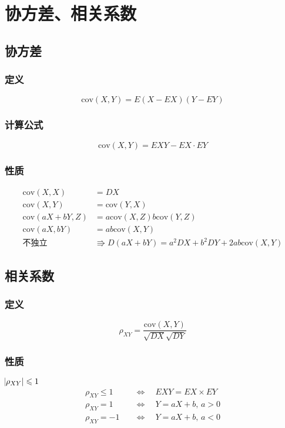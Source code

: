 \section{协方差、相关系数}
\label{sec:协方差_相关系数}

\subsection{协方差}
\label{sub:协方差}

\subsubsection{定义}
\label{ssub:定义}

\[
    \mathrm{cov}(X,Y) = E(X-EX)(Y-EY)
\]

\subsubsection{计算公式}
\label{ssub:计算公式}

\[
    \mathrm{cov}(X,Y) = EXY-EX \cdot EY
\]

\subsubsection{性质}
\label{ssub:性质}

\begin{align}
    \mathrm{cov}(X,X) &= DX \\
    \mathrm{cov}(X,Y) &= \mathrm{cov}(Y,X) \\
    \mathrm{cov}(aX+bY,Z) &= a\mathrm{cov}(X,Z) b\mathrm{cov}(Y,Z) \\
    \mathrm{cov}(aX,bY) &= ab\mathrm{cov}(X,Y) \\
    \text{不独立} &\Rrightarrow D(aX+bY) = a^2DX + b^2DY + 2ab\mathrm{cov}(X,Y)
\end{align}

\subsection{相关系数}
\label{sub:相关系数}

\subsubsection{定义}
\label{ssub:定义}

\[
    \rho_{XY} = \frac{\mathrm{cov}(X,Y)}{\sqrt{DX}\sqrt{DY}}
\]

\subsubsection{性质}
\label{ssub:性质}

$\abs{\rho_{XY}} \leqslant 1$
\begin{align}
    \rho_{XY} \leqslant 1 \quad &\Longleftrightarrow \quad EXY = EX \times EY \\
    \rho_{XY} = 1 \quad &\Longleftrightarrow \quad Y =aX+b,\,a>0 \\
    \rho_{XY} =-1 \quad &\Longleftrightarrow \quad Y =aX+b,\,a<0 \\
\end{align}
